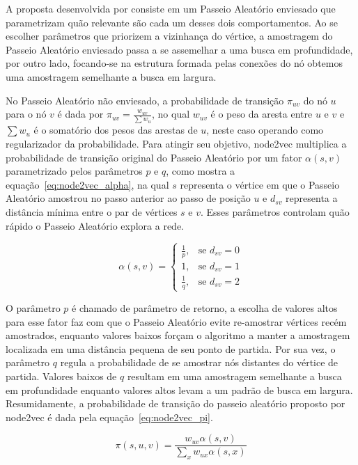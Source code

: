 A proposta desenvolvida por \citet{grover16} consiste em um Passeio Aleatório
enviesado que parametrizam quão relevante são cada um desses dois comportamentos.
Ao se escolher parâmetros que priorizem a vizinhança do vértice, a amostragem do
Passeio Aleatório enviesado passa a se assemelhar a uma busca em profundidade,
por outro lado, focando-se na estrutura formada pelas conexões do nó obtemos uma
amostragem semelhante a busca em largura.

No Passeio Aleatório não enviesado, a probabilidade de transição $\pi_{uv}$ do
nó $u$ para o nó $v$ é dada por $\pi_{uv} = \frac{w_{uv}}{\sum{w_u}}$, no qual
$w_{uv}$ é o peso da aresta entre $u$ e $v$ e $\sum{w_u}$ é o somatório dos
pesos das arestas de $u$, neste caso operando como regularizador da probabilidade.
Para atingir seu objetivo, node2vec multiplica a probabilidade de transição
original do Passeio Aleatório por um fator $\alpha(s, v)$ parametrizado pelos
parâmetros $p$ e $q$, como mostra a equação~\ref{eq:node2vec_alpha}, na qual
$s$ representa o vértice em que o Passeio Aleatório amostrou no passo anterior
ao passo de posição $u$ e $d_{sv}$ representa a distância mínima entre o par
de vértices $s$ e $v$.
Esses parâmetros controlam quão rápido o Passeio Aleatório explora a rede.

\begin{equation} \label{eq:node2vec_alpha}
    \alpha(s, v) =
    \begin{cases}
        \frac{1}{p} ,& \text{se } d_{sv} = 0\\
        1           ,& \text{se } d_{sv} = 1\\
        \frac{1}{q} ,& \text{se } d_{sv} = 2
    \end{cases}
\end{equation}

O parâmetro $p$ é chamado de parâmetro de retorno, a escolha de valores altos
para esse fator faz com que o Passeio Aleatório evite re-amostrar vértices
recém amostrados, enquanto valores baixos forçam o algoritmo a manter a
amostragem localizada em uma distância pequena de seu ponto de partida.
Por sua vez, o parâmetro $q$ regula a probabilidade de se amostrar nós distantes
do vértice de partida.
Valores baixos de $q$ resultam em uma amostragem semelhante a busca em
profundidade enquanto valores altos levam a um padrão de busca em largura.
Resumidamente, a probabilidade de transição do passeio aleatório proposto por
node2vec é dada pela equação~\ref{eq:node2vec_pi}.

\begin{equation} \label{eq:node2vec_pi}
    \pi(s, u, v) = \frac{w_{uv} \alpha(s,v)}{\sum_{x} w_{ux} \alpha(s,x)}
\end{equation}


